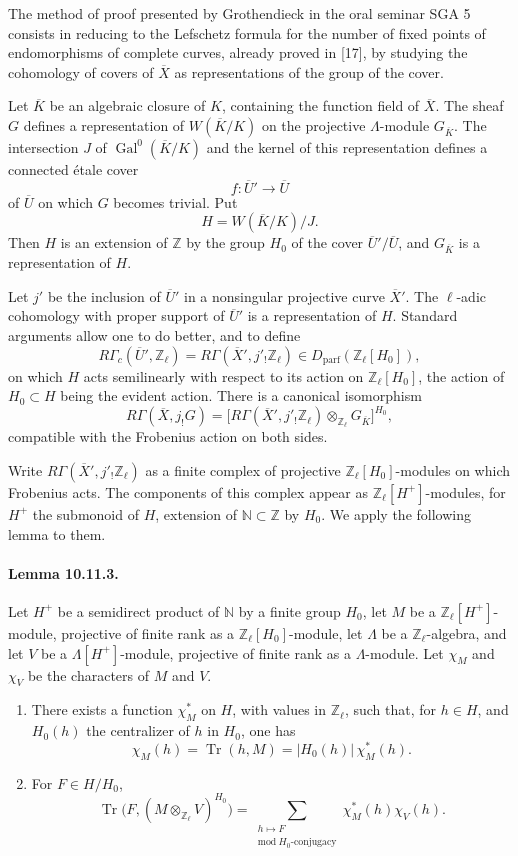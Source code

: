 \documentclass[10pt]{article}
\newcommand{\Z}{\mathbb Z}
\newcommand{\Gal}{\operatorname{Gal}}
\newcommand{\Tr}{\operatorname{Tr}}
\providecommand{\Gal}{\operatorname{Gal}}
\providecommand{\Gal}{\operatorname{Gal}}
\providecommand{\Tr}{\operatorname{Tr}}
\providecommand{\Dparf}{D_{\mathrm{parf}}}
\providecommand{\Gal}{\operatorname{Gal}}
\providecommand{\Tr}{\operatorname{Tr}}
\providecommand{\Gal}{\operatorname{Gal}}
\providecommand{\Tr}{\operatorname{Tr}}
\begin{document}
The method of proof presented by Grothendieck in the oral seminar SGA 5 consists in reducing to the Lefschetz formula for the number of fixed points of endomorphisms of complete curves, already proved in [17], by studying the cohomology of covers of \(\overline X\) as representations of the group of the cover.

Let \(\overline K\) be an algebraic closure of \(K\), containing the function field of \(\overline X\). The sheaf \(G\) defines a representation of \(W(\overline K/K)\) on the projective \(\Lambda\)-module \(G_{\overline K}\). The intersection \(J\) of \(\Gal^0(\overline K/K)\) and the kernel of this representation defines a connected étale cover
\[
f:\overline U'\longrightarrow \overline U
\]
of \(\overline U\) on which \(G\) becomes trivial. Put
\[
H=W(\overline K/K)/J.
\]
Then \(H\) is an extension of \(\Z\) by the group \(H_0\) of the cover \(\overline U'/\overline U\), and \(G_{\overline K}\) is a representation of \(H\).

Let \(j'\) be the inclusion of \(\overline U'\) in a nonsingular projective curve \(\overline X'\). The \(\ell\)-adic cohomology with proper support of \(\overline U'\) is a representation of \(H\). Standard arguments allow one to do better, and to define
\[
R\Gamma_c(\overline U',\Z_\ell)
=
R\Gamma(\overline X',j'_!\Z_\ell)
\in\Dparf(\Z_\ell[H_0]),
\]
on which \(H\) acts semilinearly with respect to its action on \(\Z_\ell[H_0]\), the action of \(H_0\subset H\) being the evident action. There is a canonical isomorphism
\[
\tag{10.11.2}
R\Gamma(\overline X,j_!G)
=
\bigl[
R\Gamma(\overline X',j'_!\Z_\ell)
\otimes_{\Z_\ell}G_{\overline K}
\bigr]^{H_0},
\]
compatible with the Frobenius action on both sides.

Write \(R\Gamma(\overline X',j'_!\Z_\ell)\) as a finite complex of projective \(\Z_\ell[H_0]\)-modules on which Frobenius acts. The components of this complex appear as \(\Z_\ell[H^+]\)-modules, for \(H^+\) the submonoid of \(H\), extension of \(\mathbb N\subset\Z\) by \(H_0\). We apply the following lemma to them.

\paragraph{Lemma 10.11.3.} Let \(H^+\) be a semidirect product of \(\mathbb N\) by a finite group \(H_0\), let \(M\) be a \(\Z_\ell[H^+]\)-module, projective of finite rank as a \(\Z_\ell[H_0]\)-module, let \(\Lambda\) be a \(\Z_\ell\)-algebra, and let \(V\) be a \(\Lambda[H^+]\)-module, projective of finite rank as a \(\Lambda\)-module. Let \(\chi_M\) and \(\chi_V\) be the characters of \(M\) and \(V\).
\begin{enumerate}[label=(\roman*)]
\item There exists a function \(\chi_M^*\) on \(H\), with values in \(\Z_\ell\), such that, for \(h\in H\), and \(H_0(h)\) the centralizer of \(h\) in \(H_0\), one has
\[
\chi_M(h)=\Tr(h,M)=|H_0(h)|\,\chi_M^*(h).
\]
\item For \(F\in H/H_0\),
\[
\Tr\bigl(F,(M\otimes_{\Z_\ell}V)^{H_0}\bigr)
=
\sum_{\substack{h\mapsto F\\ \mathrm{mod}\ H_0\text{-conjugacy}}}
\chi_M^*(h)\chi_V(h).
\]
\end{enumerate}
\end{document}
